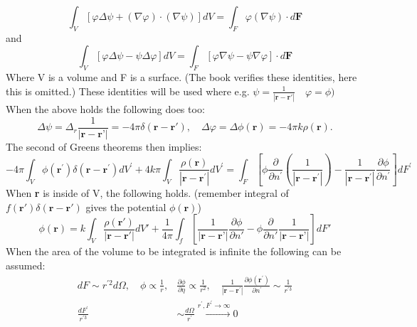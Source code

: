 \begin{equation}
    \int_{V}[\varphi \Delta \psi+(\nabla \varphi) \cdot(\nabla \psi)] d V=\int_{F} \varphi(\nabla \psi) \cdot d \mathbf{F}
\end{equation}
and
\begin{equation}
    \int_{V}[\varphi \Delta \psi-\psi \Delta \varphi] d V=\int_{F}[\varphi \nabla \psi-\psi \nabla \varphi] \cdot d \mathbf{F}
\end{equation}
Where V is a volume and F is a surface. (The book verifies these identities, here this is omitted.) These identities will be used where
e.g. $ \displaystyle \psi = \frac{1}{|\textbf{r}-\textbf{r}'|} \quad \varphi = \phi)$ 
\\
\noindent When the above holds the following does too:
\begin{equation}
    \Delta \psi = \Delta_r \frac{1}{|\textbf{r}-\textbf{r'}|} = -4\pi \delta(\textbf{r}-\textbf{r}'), \quad \Delta \varphi = \Delta \phi(\textbf{r}) = -4\pi k \rho(\textbf{r}).
\end{equation}
The second of Greens theorems then implies:
\begin{equation}
    -4 \pi \int_{V} \phi\left(\mathbf{r}^{\prime}\right) \delta\left(\mathbf{r}-\mathbf{r}^{\prime}\right) d V^{\prime}+4 k \pi \int_{V} \frac{\rho(\mathbf{r})}{\left|\mathbf{r}-\mathbf{r}^{\prime}\right|} d V^{\prime} =\int_{F}\left[\phi \frac{\partial}{\partial n^{\prime}}\left(\frac{1}{\left|\mathbf{r}-\mathbf{r}^{\prime}\right|}\right)-\frac{1}{\left|\mathbf{r}-\mathbf{r}^{\prime}\right|} \frac{\partial \phi}{\partial n^{\prime}}\right] d F^{\prime} 
\end{equation}
When \textbf{r} is inside of V, the following holds. (remember integral of $f(\textbf{r}')\delta(\textbf{r}- \textbf{r}')$ gives the potential $\phi(\textbf{r})$)
\begin{equation}
    \phi(\textbf{r}) = k \int_V \frac{\rho(\textbf{r}')}{|\textbf{r}-\textbf{r}'|} dV' + \frac{1}{4\pi}\int_f \left[\frac{1}{|\textbf{r}-\textbf{r'}|}\frac{\partial \phi}{\partial n'}-\phi\frac{\partial}{\partial n'}\frac{1}{|\textbf{r}-\textbf{r'}|} \right] dF'
\end{equation}
When the area of the volume to be integrated is infinite the following can be assumed:
\begin{equation}
    \begin{aligned}
    d F \sim r^{\prime 2} d \Omega, \quad \phi \propto \frac{1}{r}, & \frac{\partial \phi}{\partial \eta} \propto \frac{1}{r^{2}}, \quad \frac{1}{\left|\mathbf{r}-\mathbf{r}^{\prime}\right|} \frac{\partial \phi\left(\mathbf{r}^{\prime}\right)}{\partial n^{\prime}} \sim \frac{1}{r^{\prime 3}} \\
    \frac{d F^{\prime}}{r^{\prime 3}} & \sim \frac{d \Omega}{{r^{\prime}}} \stackrel{r^{\prime}, F^{\prime} \rightarrow \infty}{\longrightarrow} 0
    \end{aligned}
    \label{eq:potential_extended}
\end{equation}
